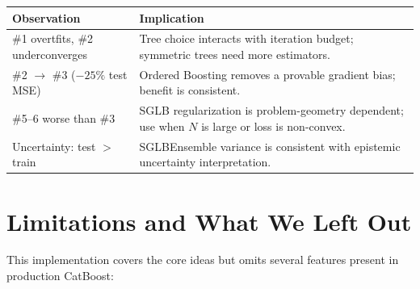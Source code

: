 \documentclass[11pt, a4paper]{article}
\begin{document}
\begin{center}
\begin{tabular}{lp{9cm}}
\toprule
\textbf{Observation} & \textbf{Implication} \\
\midrule
\#1 overtfits, \#2 underconverges &
  Tree choice interacts with iteration budget; symmetric trees need more estimators. \\
\#2 $\to$ \#3 ($-25\%$ test MSE) &
  Ordered Boosting removes a provable gradient bias; benefit is consistent. \\
\#5--6 worse than \#3 &
  SGLB regularization is problem-geometry dependent; use when $N$ is large
  or loss is non-convex. \\
Uncertainty: test $>$ train &
  SGLBEnsemble variance is consistent with epistemic uncertainty interpretation. \\
\bottomrule
\end{tabular}
\end{center}

\section{Limitations and What We Left Out}
\label{sec:limitations}

This implementation covers the core ideas but omits several features
present in production CatBoost:
\end{document}
